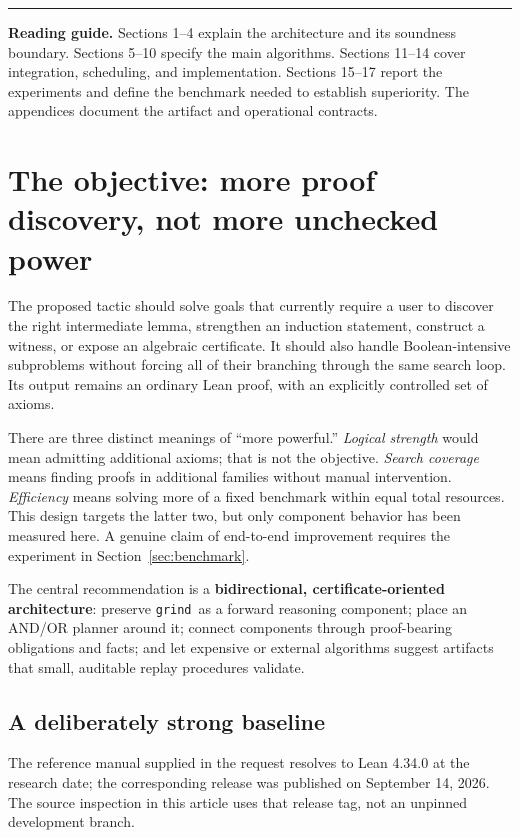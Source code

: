 \documentclass[11pt,a4paper]{article}
\newcommand{\grind}{\texttt{grind}}
\begin{document}
\vfill
\hrule
\vspace{3mm}
\small
\textbf{Reading guide.} Sections 1--4 explain the architecture and its soundness boundary. Sections 5--10 specify the main algorithms. Sections 11--14 cover integration, scheduling, and implementation. Sections 15--17 report the experiments and define the benchmark needed to establish superiority. The appendices document the artifact and operational contracts.
\newpage
\normalsize
\tableofcontents
\newpage

\section{The objective: more proof discovery, not more unchecked power}

The proposed tactic should solve goals that currently require a user to discover the right intermediate lemma, strengthen an induction statement, construct a witness, or expose an algebraic certificate. It should also handle Boolean-intensive subproblems without forcing all of their branching through the same search loop. Its output remains an ordinary Lean proof, with an explicitly controlled set of axioms.

There are three distinct meanings of ``more powerful.'' \emph{Logical strength} would mean admitting additional axioms; that is not the objective. \emph{Search coverage} means finding proofs in additional families without manual intervention. \emph{Efficiency} means solving more of a fixed benchmark within equal total resources. This design targets the latter two, but only component behavior has been measured here. A genuine claim of end-to-end improvement requires the experiment in Section~\ref{sec:benchmark}.

The central recommendation is a \textbf{bidirectional, certificate-oriented architecture}: preserve \grind\ as a forward reasoning component; place an AND/OR planner around it; connect components through proof-bearing obligations and facts; and let expensive or external algorithms suggest artifacts that small, auditable replay procedures validate.

\subsection{A deliberately strong baseline}

The reference manual supplied in the request resolves to Lean 4.34.0 at the research date; the corresponding release was published on September 14, 2026. The source inspection in this article uses that release tag, not an unpinned development branch.\cite{lean-version,lean-release}
\end{document}
